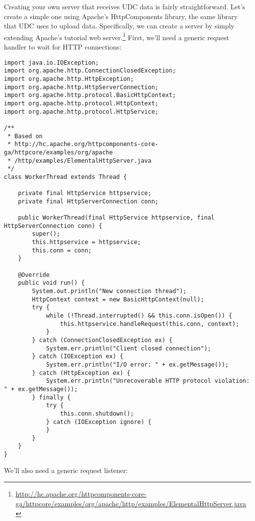 \newpage

Creating your own server that receives UDC data is fairly straightforward.
Let's create a simple one using Apache's HttpComponents library,
the same library that UDC uses to upload data.
Specifically, we can create a server by simply extending Apache's tutorial
web server.\footnote{\url{http://hc.apache.org/httpcomponents-core-ga/httpcore/examples/org/apache/http/examples/ElementalHttpServer.java}}
First, we'll need a generic request handler to wait for HTTP connections:

\begin{lstlisting}
import java.io.IOException;
import org.apache.http.ConnectionClosedException;
import org.apache.http.HttpException;
import org.apache.http.HttpServerConnection;
import org.apache.http.protocol.BasicHttpContext;
import org.apache.http.protocol.HttpContext;
import org.apache.http.protocol.HttpService;

/**
 * Based on
 * http://hc.apache.org/httpcomponents-core-ga/httpcore/examples/org/apache
 * /http/examples/ElementalHttpServer.java
 */
class WorkerThread extends Thread {

	private final HttpService httpservice;
	private final HttpServerConnection conn;

	public WorkerThread(final HttpService httpservice, final HttpServerConnection conn) {
		super();
		this.httpservice = httpservice;
		this.conn = conn;
	}

	@Override
	public void run() {
		System.out.println("New connection thread");
		HttpContext context = new BasicHttpContext(null);
		try {
			while (!Thread.interrupted() && this.conn.isOpen()) {
				this.httpservice.handleRequest(this.conn, context);
			}
		} catch (ConnectionClosedException ex) {
			System.err.println("Client closed connection");
		} catch (IOException ex) {
			System.err.println("I/O error: " + ex.getMessage());
		} catch (HttpException ex) {
			System.err.println("Unrecoverable HTTP protocol violation: " + ex.getMessage());
		} finally {
			try {
				this.conn.shutdown();
			} catch (IOException ignore) {
			}
		}
	}
}
\end{lstlisting}

\newpage
\noindent
We'll also need a generic request listener:

